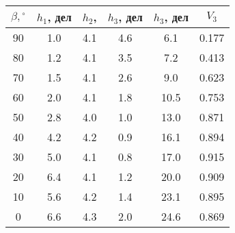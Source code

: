 \begin{tabular}{cccccc}
\toprule
$\beta, {^\circ}$ & $h_1$, дел & $h_2$, & $h_3$, дел & $h_3$, дел & $V_3$ \\
\midrule
90 & 1.0 & 4.1 & 4.6 &  6.1 & 0.177 \\
80 & 1.2 & 4.1 & 3.5 &  7.2 & 0.413 \\
70 & 1.5 & 4.1 & 2.6 &  9.0 & 0.623 \\
60 & 2.0 & 4.1 & 1.8 & 10.5 & 0.753 \\
50 & 2.8 & 4.0 & 1.0 & 13.0 & 0.871 \\
40 & 4.2 & 4.2 & 0.9 & 16.1 & 0.894 \\
30 & 5.0 & 4.1 & 0.8 & 17.0 & 0.915 \\
20 & 6.4 & 4.1 & 1.2 & 20.0 & 0.909 \\
10 & 5.6 & 4.2 & 1.4 & 23.1 & 0.895 \\
0  & 6.6 & 4.3 & 2.0 & 24.6 & 0.869 \\
\bottomrule
\end{tabular}
